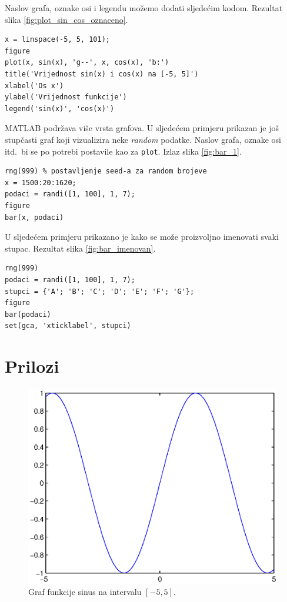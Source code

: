 \documentclass[a4paper, 10pt]{article}
\begin{document}
Naslov grafa, oznake osi i legendu možemo dodati sljedećim kodom. Rezultat slika \ref{fig:plot_sin_cos_oznaceno}.

\begin{lstlisting}
x = linspace(-5, 5, 101);
figure
plot(x, sin(x), 'g--', x, cos(x), 'b:')
title('Vrijednost sin(x) i cos(x) na [-5, 5]')
xlabel('Os x')
ylabel('Vrijednost funkcije')
legend('sin(x)', 'cos(x)')
\end{lstlisting}

MATLAB podržava više vrsta grafova. U sljedećem primjeru prikazan je još stupčasti graf koji vizualizira neke \textit{random} podatke. Naslov grafa, oznake osi itd.\ bi se po potrebi postavile kao za \texttt{plot}. Izlaz slika \ref{fig:bar_1}.

\begin{lstlisting}
rng(999) % postavljenje seed-a za random brojeve
x = 1500:20:1620;
podaci = randi([1, 100], 1, 7);
figure
bar(x, podaci)
\end{lstlisting}

U sljedećem primjeru prikazano je kako se može proizvoljno imenovati svaki stupac. Rezultat slika \ref{fig:bar_imenovan}.

\begin{lstlisting}
rng(999)
podaci = randi([1, 100], 1, 7);
stupci = {'A'; 'B'; 'C'; 'D'; 'E'; 'F'; 'G'};
figure
bar(podaci)
set(gca, 'xticklabel', stupci)
\end{lstlisting}

\clearpage

\section*{Prilozi}
\label{sec:prilozi}

\begin{figure}[!htb]
\centering
\includegraphics[width=\linewidth]{slike/plot_sin_1.eps}
\caption{Graf funkcije sinus na intervalu $[-5, 5]$.}
\label{fig:plot_sin_1}
\end{figure}
\end{document}
